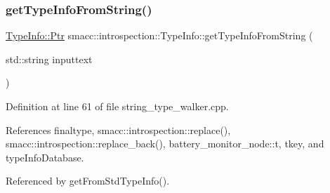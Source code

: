 \subsubsection{\texorpdfstring{get\+Type\+Info\+From\+String()}{getTypeInfoFromString()}}
{\footnotesize\ttfamily \hyperlink{classsmacc_1_1introspection_1_1TypeInfo_aa6ffd9c39811d59f7c771941b7fad860}{Type\+Info\+::\+Ptr} smacc\+::introspection\+::\+Type\+Info\+::get\+Type\+Info\+From\+String (\begin{DoxyParamCaption}\item[{std\+::string}]{inputtext }\end{DoxyParamCaption})\hspace{0.3cm}{\ttfamily [static]}}



Definition at line 61 of file string\+\_\+type\+\_\+walker.\+cpp.



References finaltype, smacc\+::introspection\+::replace(), smacc\+::introspection\+::replace\+\_\+back(), battery\+\_\+monitor\+\_\+node\+::t, tkey, and type\+Info\+Database.



Referenced by get\+From\+Std\+Type\+Info().


